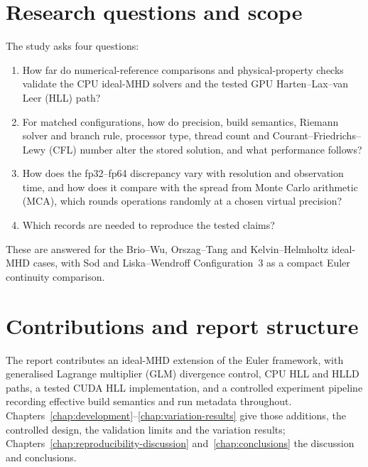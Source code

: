 \section{Research questions and scope}

The study asks four questions:

\begin{enumerate}
  \item\label{rq:mhd-validation} How far do numerical-reference comparisons and
        physical-property checks validate the CPU ideal-MHD solvers and the
        tested GPU Harten--Lax--van Leer (HLL) path?
  \item\label{rq:controlled-variation} For matched configurations, how do
        precision, build semantics, Riemann solver and branch rule, processor
        type, thread count and Courant--Friedrichs--Lewy (CFL) number alter the
        stored solution, and what performance follows?
  \item\label{rq:scale-time-mca} How does the fp32--fp64 discrepancy vary with
        resolution and observation time, and how does it compare with the
        spread from Monte Carlo arithmetic (MCA), which rounds operations
        randomly at a chosen virtual precision?
  \item\label{rq:reproducibility-record} Which records are needed to reproduce
        the tested claims?
\end{enumerate}

These are answered for the Brio--Wu, Orszag--Tang and Kelvin--Helmholtz
ideal-MHD cases, with Sod and Liska--Wendroff Configuration~3 as a compact
Euler continuity comparison.

\section{Contributions and report structure}

The report contributes an ideal-MHD extension of the Euler framework, with
generalised Lagrange multiplier (GLM) divergence control, CPU HLL and HLLD
paths, a tested CUDA HLL implementation, and a controlled experiment pipeline
recording effective build semantics and run metadata throughout.
Chapters~\ref{chap:development}--\ref{chap:variation-results} give those
additions, the controlled design, the validation limits and the variation
results; Chapters~\ref{chap:reproducibility-discussion}
and~\ref{chap:conclusions} the discussion and conclusions.
